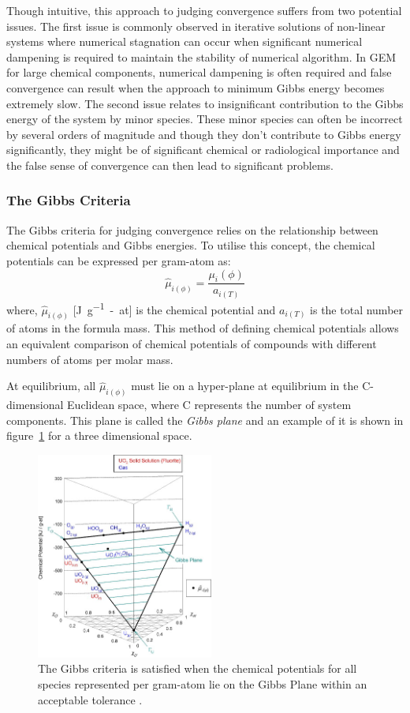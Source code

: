 		Though intuitive, this approach to judging convergence suffers from two potential issues. The first issue is commonly observed in iterative solutions of non-linear systems where numerical stagnation can occur when significant numerical dampening is required to maintain the stability of numerical algorithm. In GEM for large chemical components, numerical dampening is often required and false convergence can result when the approach to minimum Gibbs energy becomes extremely slow.  The second issue relates to insignificant contribution to the Gibbs energy of the system  by minor species. These minor species can often be incorrect by several orders of magnitude and though they don't contribute to Gibbs energy significantly, they might be of significant chemical or radiological importance and the false sense of convergence can then lead to significant problems.
		
		\subsubsection{The Gibbs Criteria}
	 The Gibbs criteria for judging convergence relies on the relationship between chemical potentials and Gibbs energies. To utilise this concept, the chemical potentials can be expressed per gram-atom as:
	 \begin{equation}
	 	\hat{\mu}_{i(\phi)} = \frac{{\mu}_i(\phi)}{a_{i(T)}}
	 \end{equation}
	 where, $\hat{\mu}_{i(\phi)}$ [\si{\joule \per g-at}] is the chemical potential and ${a_{i(T)}}$  is the total number of atoms in the formula mass. This method of defining chemical potentials allows an equivalent comparison of chemical potentials of compounds with different numbers of atoms per molar mass.
	 
	 At equilibrium, all $\hat{\mu}_{i(\phi)}$ must lie on a hyper-plane at equilibrium in the C-dimensional Euclidean space, where C represents the number of system components. This plane is called the \emph{Gibbs plane} and an example of it is shown in figure~\ref{fig:GibbsPlane} for a three dimensional space.
	 \begin{figure}[htbp]
		\centering
		\includegraphics[width=0.52\textwidth]{figures/Gibbs_plane.jpg}
		\caption{The Gibbs criteria is satisfied when the chemical potentials for all species represented per gram-atom lie on the Gibbs Plane within an acceptable tolerance \cite{Piro11a}.}
		\label{fig:GibbsPlane}
	\end{figure}

